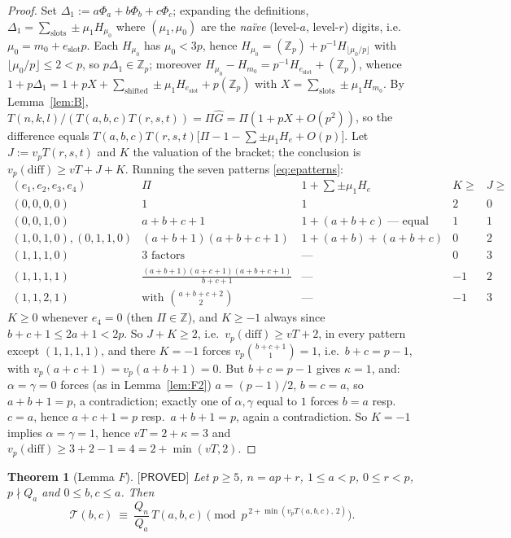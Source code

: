 \documentclass[11pt,reqno]{amsart}
\theoremstyle{plain}
\newtheorem{theorem}{Theorem}[section]
\theoremstyle{definition}
\theoremstyle{remark}
\numberwithin{equation}{section}
\newcommand{\ZZ}{\mathbb{Z}}
\newcommand{\Zp}{\ZZ_p}
\newcommand{\Tcal}{\mathcal{T}}
\newcommand{\PROVED}{\textsf{[PROVED]}}
\begin{document}
\begin{proof}
Set $\Delta_1:=a\Phi_a+b\Phi_b+c\Phi_c$; expanding the definitions,
$\Delta_1=\sum_{\mathrm{slots}}\pm\mu_1H_{\mu_0}$ where $(\mu_1,\mu_0)$ are the \emph{na\"ive}
(level-$a$, level-$r$) digits, i.e.\ $\mu_0=m_0+e_{\mathrm{slot}}p$. Each $H_{\mu_0}$ has
$\mu_0<3p$, hence $H_{\mu_0}=(\Zp)+p^{-1}H_{\lfloor\mu_0/p\rfloor}$ with
$\lfloor\mu_0/p\rfloor\le2<p$, so $p\Delta_1\in\Zp$; moreover
$H_{\mu_0}-H_{m_0}=p^{-1}H_{e_{\mathrm{slot}}}+(\Zp)$, whence
$1+p\Delta_1=1+pX+\sum_{\text{shifted}}\pm\mu_1H_{e_{\mathrm{slot}}}+p(\Zp)$ with
$X=\sum_{\mathrm{slots}}\pm\mu_1H_{m_0}$. By Lemma~\ref{lem:B},
$T(n,k,l)/(T(a,b,c)T(r,s,t))=\Pi\hat G=\Pi(1+pX+O(p^2))$, so the difference equals
$T(a,b,c)T(r,s,t)\bigl[\Pi-1-\sum\pm\mu_1H_e+O(p)\bigr]$. Let $J:=v_pT(r,s,t)$ and $K$ the
valuation of the bracket; the conclusion is $v_p(\mathrm{diff})\ge vT+J+K$. Running the seven
patterns \eqref{eq:epatterns}:
\[
\begin{array}{lcccc}
(e_1,e_2,e_3,e_4) & \Pi & 1+\sum\pm\mu_1H_e & K\ge & J\ge\\\hline
(0,0,0,0) & 1 & 1 & 2 & 0\\
(0,0,1,0) & a{+}b{+}c{+}1 & 1+(a{+}b{+}c)\ \text{---\ equal} & 1 & 1\\
(1,0,1,0),(0,1,1,0) & (a{+}b{+}1)(a{+}b{+}c{+}1) & 1+(a{+}b)+(a{+}b{+}c) & 0 & 2\\
(1,1,1,0) & \text{3 factors} & \text{---} & 0 & 3\\
(1,1,1,1) & \frac{(a+b+1)(a+c+1)(a+b+c+1)}{b+c+1} & \text{---} & -1 & 2\\
(1,1,2,1) & \text{with }\binom{a+b+c+2}{2} & \text{---} & -1 & 3
\end{array}
\]
$K\ge0$ whenever $e_4=0$ (then $\Pi\in\ZZ$), and $K\ge-1$ always since $b+c+1\le2a+1<2p$. So
$J+K\ge2$, i.e.\ $v_p(\mathrm{diff})\ge vT+2$, in every pattern except $(1,1,1,1)$, and there
$K=-1$ forces $v_p\binom{b+c+1}{1}=1$, i.e.\ $b+c=p-1$, with $v_p(a+c+1)=v_p(a+b+1)=0$. But
$b+c=p-1$ gives $\kappa=1$, and: $\alpha=\gamma=0$ forces (as in Lemma~\ref{lem:F2})
$a=(p-1)/2$, $b=c=a$, so $a+b+1=p$, a contradiction; exactly one of $\alpha,\gamma$ equal to
$1$ forces $b=a$ resp.\ $c=a$, hence $a+c+1=p$ resp.\ $a+b+1=p$, again a contradiction. So
$K=-1$ implies $\alpha=\gamma=1$, hence $vT=2+\kappa=3$ and
$v_p(\mathrm{diff})\ge3+2-1=4=2+\min(vT,2)$.
\end{proof}

\begin{theorem}[Lemma $F$]\label{lem:F}
$\PROVED$ Let $p\ge5$, $n=ap+r$, $1\le a<p$, $0\le r<p$, $p\nmid Q_a$ and $0\le b,c\le a$. Then
\[
\Tcal(b,c)\ \equiv\ \frac{Q_n}{Q_a}\,T(a,b,c)\pmod{p^{\,2+\min(v_pT(a,b,c),\,2)}} .
\]
\end{theorem}
\end{document}
